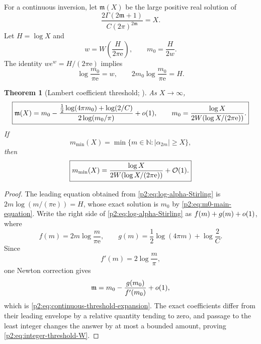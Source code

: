 \documentclass[11pt,oneside]{article}
\numberwithin{equation}{section}
\newtheorem{theorem}{Theorem}[section]
\theoremstyle{definition}
\theoremstyle{remark}
\newcommand{\N}{\mathbb N}
\newcommand{\e}{\mathrm e}
\begin{document}
For a continuous inversion, let $\mathfrak m(X)$ be the large positive real solution of
\begin{equation}
 \frac{2\Gamma(2\mathfrak m+1)}{C(2\pi)^{2\mathfrak m}}=X.
 \label{p2:eq:continuous-threshold}
\end{equation}
Let $H=\log X$ and
\begin{equation}
 w=W\!\left(\frac{H}{2\pi\e}\right),
 \qquad
 m_0=\frac{H}{2w}.
 \label{p2:eq:m0-W}
\end{equation}
The identity $we^w=H/(2\pi\e)$ implies
\begin{equation}
 \log\frac{m_0}{\pi\e}=w,
 \qquad
 2m_0\log\frac{m_0}{\pi\e}=H.
 \label{p2:eq:m0-main-equation}
\end{equation}

\begin{theorem}[Lambert coefficient threshold; \statusnew]
\label{p2:thm:Lambert-threshold}
As $X\to\infty$,
\begin{equation}
 \boxed{
 \mathfrak m(X)
 =m_0-
 \frac{\frac12\log(4\pi m_0)+\log(2/C)}
 {2\log(m_0/\pi)}
 +\littleo(1),
 \qquad
 m_0=\frac{\log X}{2W(\log X/(2\pi\e))}.
 }
 \label{p2:eq:continuous-threshold-expansion}
\end{equation}
If
\begin{equation}
 m_{\min}(X)=\min\{m\in\N:|\alpha_{2m}|\ge X\},
 \label{p2:eq:integer-threshold}
\end{equation}
then
\begin{equation}
 \boxed{
 m_{\min}(X)
 =\frac{\log X}{2W(\log X/(2\pi\e))}+\BigO(1).
 }
 \label{p2:eq:integer-threshold-W}
\end{equation}
\end{theorem}

\begin{proof}
The leading equation obtained from \eqref{p2:eq:log-alpha-Stirling} is
$2m\log(m/(\pi\e))=H$, whose exact solution is $m_0$ by
\eqref{p2:eq:m0-main-equation}.  Write the right side of \eqref{p2:eq:log-alpha-Stirling} as
$f(m)+g(m)+o(1)$, where
\[
 f(m)=2m\log\frac{m}{\pi\e},
 \qquad
 g(m)=\frac12\log(4\pi m)+\log\frac2C.
\]
Since
\begin{equation*}
 f'(m)=2\log\frac m\pi,
\end{equation*}
one Newton correction gives
\[
 \mathfrak m=m_0-\frac{g(m_0)}{f'(m_0)}+o(1),
\]
which is \eqref{p2:eq:continuous-threshold-expansion}.  The exact coefficients differ from their
leading envelope by a relative quantity tending to zero, and passage to the least integer changes the
answer by at most a bounded amount, proving \eqref{p2:eq:integer-threshold-W}.
\end{proof}
\end{document}
